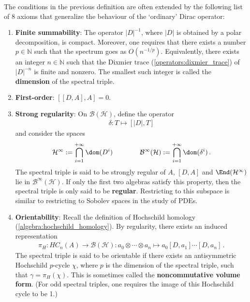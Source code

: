     \begin{remark}
        The conditions in the previous definition are often extended by the following list of 8 axioms that generalize the behaviour of the `ordinary' Dirac operator:
        \begin{enumerate}
            \item\textbf{Finite summability}: The operator $|D|^{-1}$, where $|D|$ is obtained by a polar decomposition, is compact. Moreover, one requires that there exists a number $p\in\mathbb{N}$ such that the spectrum goes as $O(n^{-1/p})$. Equivalently, there exists an integer $n\in\mathbb{N}$ such that the Dixmier trace (\cref{operators:dixmier_trace}) of $|D|^{-n}$ is finite and nonzero. The smallest such integer is called the \textbf{dimension} of the spectral triple.
            \item\textbf{First-order}: $[[D,A],A]=0$.
            \item\textbf{Strong regularity}: On $\mathcal{B}(\mathcal{H})$, define the operator
            \begin{gather}
                \delta:T\mapsto[|D|,T]
            \end{gather}
            and consider the spaces
            \begin{gather}
                \mathcal{H}^\infty:=\bigcap_{i=1}^{+\infty}\dom(D^i)\qquad\qquad\mathcal{B}^\infty(\mathcal{H}):=\bigcap_{i=1}^{+\infty}\dom(\delta^i)\,.
            \end{gather}
            The spectral triple is said to be strongly regular of $A$, $[D,A]$ and $\End(\mathcal{H}^\infty)$ lie in $\mathcal{B}^\infty(\mathcal{H})$. If only the first two algebras satisfy this property, then the spectral triple is only said to be \textbf{regular}. Restricting to this subspace is similar to restricting to Sobolev spaces in the study of PDEs.
            \item\textbf{Orientability}: Recall the definition of Hochschild homology (\cref{algebra:hochschild_homology}). By regularity, there exists an induced representation
            \begin{gather}
                \pi_H:HC_n(A)\rightarrow\mathcal{B}(\mathcal{H}):a_0\otimes\cdots\otimes a_n\mapsto a_0[D,a_1]\cdots[D,a_n]\,.
            \end{gather}
            The spectral triple is said to be orientable if there exists an antisymmetric Hochschild $p$-cycle $\chi$, where $p$ is the dimension of the spectral triple, such that $\gamma=\pi_H(\chi)$. This is sometimes called the \textbf{noncommutative volume form}. (For odd spectral triples, one requires the image of this Hochschild cycle to be 1.)

\end{enumerate}
\end{remark}
